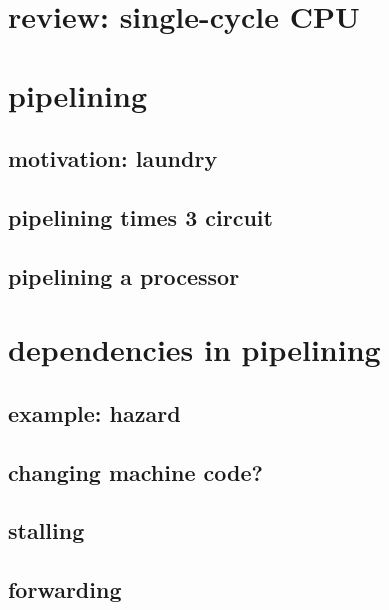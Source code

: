 \date{}
\title{}
\date{}

\begin{frame}
    \titlepage
\end{frame}

\section{review: single-cycle CPU}


\section{pipelining}

\subsection{motivation: laundry}

\subsection{pipelining times 3 circuit}

\subsection{pipelining a processor}

\section{dependencies in pipelining}

\subsection{example: hazard}

\subsection{changing machine code?}

\subsection{stalling}

\subsection{forwarding}

